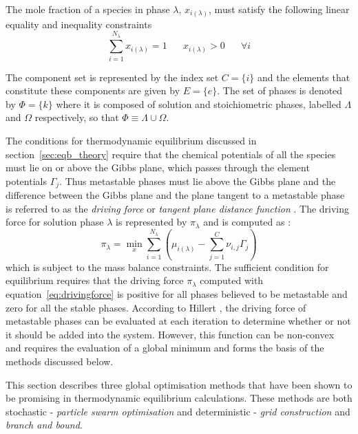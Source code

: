 	\begin{constraint}
		The mole fraction of a species in phase $\lambda$, $x_{i(\lambda)}$, must satisfy the following linear equality and inequality constraints
		\begin{equation}
		\sum_{i=1}^{N_\lambda} x_{i(\lambda)} = 1 \mspace{30mu}x_{i(\lambda)} > 0\mspace{30mu} \forall i
		\end{equation}
	\end{constraint}

The component set is represented by the index set $C = \{i\}$ and the elements that constitute these components are given by $E  = \{e\}$. The set of phases is denoted by $\Phi = \{k\}$ where it is composed of solution and stoichiometric phases, labelled $\Lambda$ and $\Omega$ respectively, so that $\Phi \equiv \Lambda\cup \Omega$.

	The conditions for thermodynamic equilibrium discussed in section~\ref{sec:eqb_theory} require that the chemical potentials of all the species must lie on or above the Gibbs plane, which passes through the element potentials $\Gamma_j$. Thus metastable phases must lie above the Gibbs plane and the difference between the Gibbs plane and the plane tangent to a metastable phase is referred to as the \emph{driving force} \cite{Lukas07} or \emph{tangent plane distance function} \cite{Lukas07,Zhang11}. The driving force for solution phase $\lambda$ is represented by $\pi_\lambda$ and is computed as \cite{Piro16}:
	\begin{equation}\label{eq:drivingforce}
		\pi_\lambda = \min_x \sum_{i=1}^{N_\lambda} \left(\mu_{i(\lambda)} - \sum_{j=1}^{C} \nu_{i,j}\Gamma_j \right)
	\end{equation}
	which is subject to the mass balance constraints. The sufficient condition for equilibrium requires that the driving force $\pi_\lambda$ computed with equation~\eqref{eq:drivingforce} is positive for all phases believed to be metastable and zero for all the stable phases. According to Hillert \cite{Hillert81}, the driving force of metastable phases can be evaluated at each iteration to determine whether or not it should be added into the system. However, this function can be non-convex and requires the evaluation of a global minimum and forms the basis of the methods discussed below.

	This section describes three global optimisation methods that have been shown to be promising in thermodynamic  equilibrium calculations. These methods are both stochastic - \emph{particle swarm optimisation} and deterministic - \emph{grid construction} and \emph{branch and bound}.


